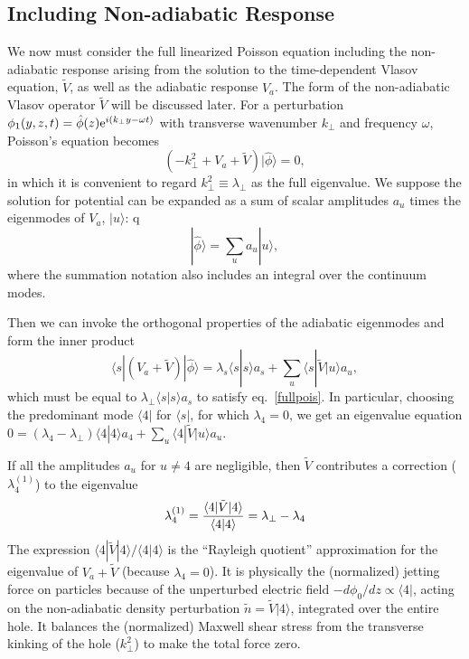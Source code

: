 \documentclass{jpp}
\def\ket#1{|#1\rangle}
\def\bra#1{\langle#1}
\begin{document}
\subsection{Including Non-adiabatic Response}
We now must consider the full linearized Poisson equation including the
non-adiabatic response arising from the solution to the time-dependent
Vlasov equation, $\tilde{V}$, as well as the adiabatic response
$V_a$. The form of the non-adiabatic Vlasov operator $\tilde{V}$ will
be discussed later. For a perturbation
$\phi_1(y,z,t)=\hat\phi(z){\rm e}^{i(k_\perp y-\omega t)}$ with
transverse wavenumber $k_\perp$ and frequency $\omega$, Poisson's
equation becomes
\begin{equation}
  \label{fullpois}
  (-k_\perp^2+V_a+\tilde{V})\ket{\hat\phi}=0,
\end{equation}
in which it is convenient to regard $k_\perp^2\equiv\lambda_\perp$ as
the full eigenvalue.  We suppose the solution for potential can be
expanded as a sum of scalar amplitudes $a_u$ times the eigenmodes of
$V_a$, $\ket{u}$:
q\begin{equation}
  \label{ketphi}
  \ket{\hat\phi}=\sum_u a_u \ket{u},
\end{equation}
where the summation notation also includes an integral over the
continuum modes.

Then we can invoke the orthogonal properties of the
adiabatic eigenmodes and form the inner product
\begin{equation}
  \label{VaVt}
  \bra{s}|(%
  V_a+\tilde{V})\ket{\hat\phi}
  = %
  \lambda_s\bra{s}\ket{s}a_s+\sum_u\bra{s}|\tilde{V}\ket{u}a_u,
\end{equation}
which must be equal to $\lambda_\perp\bra{s}\ket{s}a_s$ to satisfy eq.\ \ref{fullpois}.
In particular, choosing the predominant mode $\bra{4}|$ for
$\bra{s}|$, for which $\lambda_4=0$, we get an eigenvalue equation
$0=(\lambda_4-\lambda_\perp)\bra{4}\ket{4}a_4+\sum_u\bra{4}|\tilde{V}\ket{u}a_u$.

If all the amplitudes $a_u$ for $u\not=4$ are negligible, then
$\tilde{V}$ contributes a correction ($\lambda_{4}^{(1)}$) to the eigenvalue
\begin{equation}
  \label{lam41}
  \lambda_{4}^{(1)}= {\bra{4}|\tilde{V}\ket{4}\over\bra{4}\ket{4}}=\lambda_\perp-\lambda_4
\end{equation}
The expression $\bra{4}|\tilde{V}\ket{4}/\bra{4}\ket{4}$ is the ``Rayleigh
quotient'' approximation for the eigenvalue of $V_a+\tilde{V}$
(because $\lambda_4=0$). It is
physically the (normalized) jetting force on particles because of the
unperturbed electric field $-d\phi_0/dz\propto\bra{4}|$, acting on the
non-adiabatic density perturbation $\tilde n = \tilde{V}\ket{4}$, integrated
over the entire hole. It balances the (normalized) Maxwell shear
stress from the transverse kinking of the hole ($k_\perp^2$) to
make the total force zero.
\end{document}
